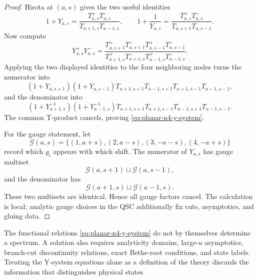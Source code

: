\begin{proof}
Hirota at \((a,s)\) gives the two useful identities
\[
  1+Y_{a,s}
  =
  \frac{T_{a,s}^+T_{a,s}^-}{T_{a+1,s}T_{a-1,s}},
  \qquad
  1+\frac1{Y_{a,s}}
  =
  \frac{T_{a,s}^+T_{a,s}^-}{T_{a,s+1}T_{a,s-1}} .
\]
Now compute
\[
  Y_{a,s}^+Y_{a,s}^-
  =
  \frac{
    T_{a,s+1}^+T_{a,s+1}^-
    T_{a,s-1}^+T_{a,s-1}^-
  }{
    T_{a+1,s}^+T_{a+1,s}^-
    T_{a-1,s}^+T_{a-1,s}^-
  } .
\]
Applying the two displayed identities to the four neighboring nodes turns the
numerator into
\[
  (1+Y_{a,s+1})(1+Y_{a,s-1})
  T_{a+1,s+1}T_{a-1,s+1}T_{a+1,s-1}T_{a-1,s-1},
\]
and the denominator into
\[
  (1+Y_{a+1,s}^{-1})(1+Y_{a-1,s}^{-1})
  T_{a+1,s+1}T_{a+1,s-1}T_{a-1,s+1}T_{a-1,s-1}.
\]
The common T-product cancels, proving
\eqref{eq:planar-n4-y-system}.

For the gauge statement, let
\[
  \mathcal G(a,s)
  =
  \{(1,a+s),(2,a-s),(3,-a-s),(4,-a+s)\}
\]
record which \(g_i\) appears with which shift.  The numerator of \(Y_{a,s}\)
has gauge multiset
\[
  \mathcal G(a,s+1)\sqcup\mathcal G(a,s-1),
\]
and the denominator has
\[
  \mathcal G(a+1,s)\sqcup\mathcal G(a-1,s).
\]
These two multisets are identical.  Hence all gauge factors cancel.  The
calculation is local; analytic gauge choices in the QSC additionally fix
cuts, asymptotics, and gluing data.
\end{proof}

\begin{warning}
\label{warn:y-system-not-complete}
The functional relations \eqref{eq:planar-n4-y-system} do not by themselves
determine a spectrum.  A solution also requires analyticity domains,
large-\(u\) asymptotics, branch-cut discontinuity relations, exact Bethe-root
conditions, and state labels.  Treating the Y-system equations alone as a
definition of the theory discards the information that distinguishes physical
states.
\end{warning}

